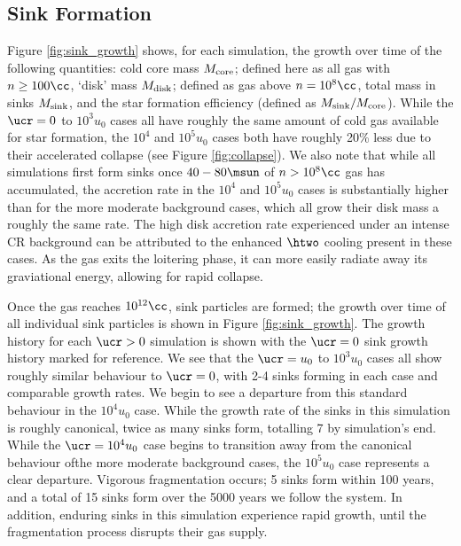 \subsection{Sink Formation}
\label{subsec:sink_formation}

Figure \ref{fig:sink_growth} shows, for each simulation, the growth over time of the following quantities: cold core mass $M_{\rm \small core}$; defined here as all gas with $n \geq 100\cc$, `disk' mass $M_{\rm \small disk}$; defined as gas above $n=10^8\cc$, total mass in sinks $M_{\rm \small sink}$, and the star formation efficiency (defined as $M_{\rm \small sink}/M_{\rm \small core}$).  While the $\ucr=0$ to $10^3u_0$ cases all have roughly the same amount of cold gas available for star formation, the $10^4$ and $10^5u_0$ cases both have roughly 20\% less due to their accelerated collapse (see Figure \ref{fig:collapse}).  We also note that while all simulations first form sinks once $40 - 80\msun$ of $n>10^8\cc$ gas has accumulated, the accretion rate in the $10^4$ and $10^5u_0$ cases is substantially higher than for the more moderate background cases, which all grow their disk mass a roughly the same rate.  The high disk accretion rate experienced under an intense CR background can be attributed to the enhanced $\htwo$ cooling present in these cases.  As the gas exits the loitering phase, it can more easily radiate away its graviational energy, allowing for rapid collapse.

Once the gas reaches $10^{12}\cc$, sink particles are formed; the growth over time of all individual sink particles is shown in Figure \ref{fig:sink_growth}. The growth history for each $\ucr > 0$ simulation is shown with the $\ucr=0$ sink growth history marked for reference.  We see that the $\ucr = u_0$ to $10^3u_0$ cases all show roughly similar behaviour to $\ucr=0$, with 2-4 sinks forming in each case and comparable growth rates.  We begin to see a departure from this standard behaviour in the $10^4u_0$ case.  While the growth rate of the sinks in this simulation is roughly canonical, twice as many sinks form, totalling 7 by simulation's end.  While the $\ucr=10^4u_0$ case begins to transition away from the canonical behaviour ofthe more moderate background cases, the $10^5u_0$ case represents a clear departure.  Vigorous fragmentation occurs; 5 sinks form within 100 years, and a total of 15 sinks form over the 5000 years we follow the system.  In addition, enduring sinks in this simulation experience rapid growth, until the fragmentation process disrupts their gas supply.
